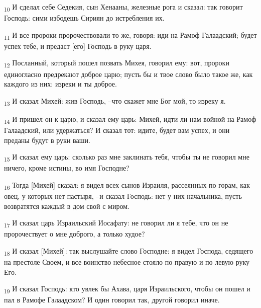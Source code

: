 \begin{tcolorbox}
\textsubscript{10} И сделал себе Седекия, сын Хенааны, железные рога и сказал: так говорит Господь: сими избодешь Сириян до истребления их.
\end{tcolorbox}
\begin{tcolorbox}
\textsubscript{11} И все пророки пророчествовали то же, говоря: иди на Рамоф Галаадский; будет успех тебе, и предаст [его] Господь в руку царя.
\end{tcolorbox}
\begin{tcolorbox}
\textsubscript{12} Посланный, который пошел позвать Михея, говорил ему: вот, пророки единогласно предрекают доброе царю; пусть бы и твое слово было такое же, как каждого из них: изреки и ты доброе.
\end{tcolorbox}
\begin{tcolorbox}
\textsubscript{13} И сказал Михей: жив Господь, --что скажет мне Бог мой, то изреку я.
\end{tcolorbox}
\begin{tcolorbox}
\textsubscript{14} И пришел он к царю, и сказал ему царь: Михей, идти ли нам войной на Рамоф Галаадский, или удержаться? И сказал тот: идите, будет вам успех, и они преданы будут в руки ваши.
\end{tcolorbox}
\begin{tcolorbox}
\textsubscript{15} И сказал ему царь: сколько раз мне заклинать тебя, чтобы ты не говорил мне ничего, кроме истины, во имя Господне?
\end{tcolorbox}
\begin{tcolorbox}
\textsubscript{16} Тогда [Михей] сказал: я видел всех сынов Израиля, рассеянных по горам, как овец, у которых нет пастыря, --и сказал Господь: нет у них начальника, пусть возвратятся каждый в дом свой с миром.
\end{tcolorbox}
\begin{tcolorbox}
\textsubscript{17} И сказал царь Израильский Иосафату: не говорил ли я тебе, что он не пророчествует о мне доброго, а только худое?
\end{tcolorbox}
\begin{tcolorbox}
\textsubscript{18} И сказал [Михей]: так выслушайте слово Господне: я видел Господа, седящего на престоле Своем, и все воинство небесное стояло по правую и по левую руку Его.
\end{tcolorbox}
\begin{tcolorbox}
\textsubscript{19} И сказал Господь: кто увлек бы Ахава, царя Израильского, чтобы он пошел и пал в Рамофе Галаадском? И один говорил так, другой говорил иначе.
\end{tcolorbox}
